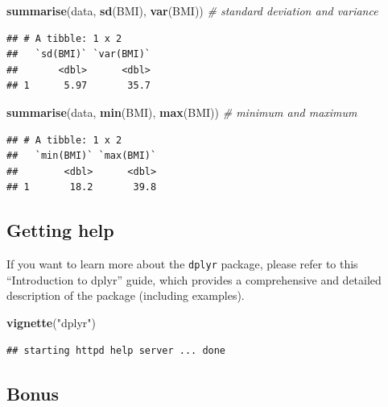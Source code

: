 \documentclass[
]{article}
\newenvironment{Shaded}{\begin{snugshade}}{\end{snugshade}}
\newcommand{\CommentTok}[1]{\textcolor[rgb]{0.56,0.35,0.01}{\textit{#1}}}
\newcommand{\FunctionTok}[1]{\textcolor[rgb]{0.13,0.29,0.53}{\textbf{#1}}}
\newcommand{\NormalTok}[1]{#1}
\newcommand{\StringTok}[1]{\textcolor[rgb]{0.31,0.60,0.02}{#1}}
\begin{document}
\begin{Shaded}
\begin{Highlighting}[]
\FunctionTok{summarise}\NormalTok{(data, }\FunctionTok{sd}\NormalTok{(BMI), }\FunctionTok{var}\NormalTok{(BMI)) }\CommentTok{\# standard deviation and variance}
\end{Highlighting}
\end{Shaded}

\begin{verbatim}
## # A tibble: 1 x 2
##   `sd(BMI)` `var(BMI)`
##       <dbl>      <dbl>
## 1      5.97       35.7
\end{verbatim}

\begin{Shaded}
\begin{Highlighting}[]
\FunctionTok{summarise}\NormalTok{(data, }\FunctionTok{min}\NormalTok{(BMI), }\FunctionTok{max}\NormalTok{(BMI)) }\CommentTok{\# minimum and maximum}
\end{Highlighting}
\end{Shaded}

\begin{verbatim}
## # A tibble: 1 x 2
##   `min(BMI)` `max(BMI)`
##        <dbl>      <dbl>
## 1       18.2       39.8
\end{verbatim}

\subsection{Getting help}\label{getting-help}

If you want to learn more about the \texttt{dplyr} package, please refer
to this ``Introduction to dplyr'' guide, which provides a comprehensive
and detailed description of the package (including examples).

\begin{Shaded}
\begin{Highlighting}[]
\FunctionTok{vignette}\NormalTok{(}\StringTok{"dplyr"}\NormalTok{)}
\end{Highlighting}
\end{Shaded}

\begin{verbatim}
## starting httpd help server ... done
\end{verbatim}

\subsection{Bonus}\label{bonus}
\end{document}
